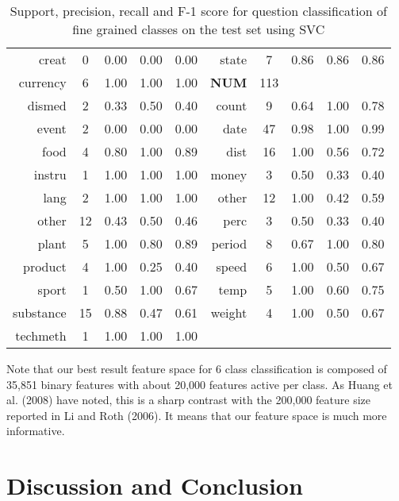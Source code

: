 \documentclass[11pt]{article}
\begin{document}
\begin{table}[ht]
\begin{center}
\begin{tabular}{r | c | c | c | c || r | c | c | c | c}
creat &     0 &  0.00 &      0.00 &      0.00  &    state &     7 &  0.86 &      0.86 &      0.86	 \\
currency &   6 &  1.00 &      1.00 &      1.00  &  \textbf{NUM} & 113 & & &	\\
dismed &     2 &  0.33 &      0.50 &      0.40  &    count &     9 &  0.64 &      1.00 &      0.78	 \\
 event &     2 &  0.00 &      0.00 &      0.00  &     date &    47 &  0.98 &      1.00 &      0.99	 \\
  food &     4 &  0.80 &      1.00 &      0.89  &     dist &    16 &  1.00 &      0.56 &      0.72	 \\
instru &     1 &  1.00 &      1.00 &      1.00  &    money &     3 &  0.50 &      0.33 &      0.40	 \\
  lang &     2 &  1.00 &      1.00 &      1.00  &    other &    12 &  1.00 &      0.42 &      0.59	 \\
 other &    12 &  0.43 &      0.50 &      0.46  &     perc &     3 &  0.50 &      0.33 &      0.40	 \\
 plant &     5 &  1.00 &      0.80 &      0.89  &   period &     8 &  0.67 &      1.00 &      0.80		 \\
product &    4 &  1.00 &      0.25 &      0.40  &    speed &     6 &  1.00 &      0.50 &      0.67	 \\
 sport &     1 &  0.50 &      1.00 &      0.67  &     temp &     5 &  1.00 &      0.60 &      0.75	 \\
substance & 15 &  0.88 &      0.47 &      0.61  &   weight &     4 &  1.00 &      0.50 &      0.67		 \\
techmeth &   1 &  1.00 &      1.00 &      1.00  &   \\
\hline
\end{tabular}
\end{center}
\caption{\label{distribution} Support, precision, recall and F-1 score for question classification of fine grained classes on the test set  using SVC}
\end{table}

Note that our best result feature space for 6 class classification is composed of 35,851 binary features with about 20,000 features active per class. As Huang et al. (2008) have noted, this is a sharp contrast with the 200,000 feature size reported in Li and Roth (2006). It means that our feature space is much more informative.

\section{Discussion and Conclusion}
\end{document}
